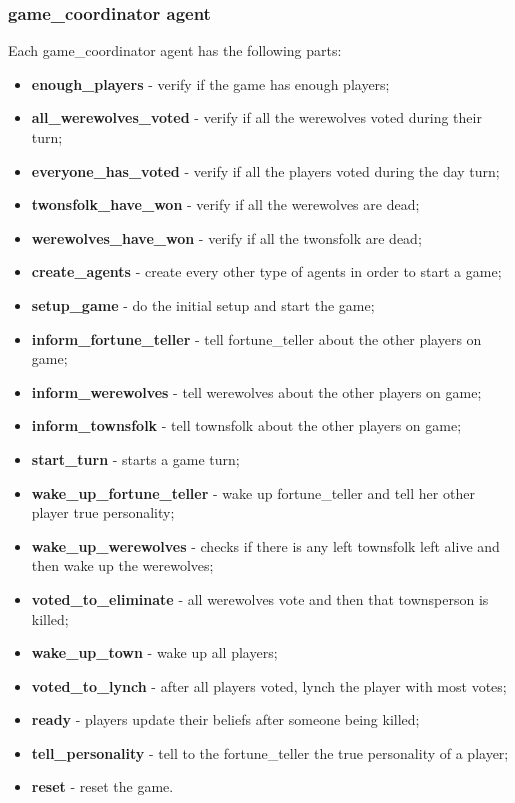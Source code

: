 \documentclass{article}
\begin{document}
\subsubsection{game\_coordinator agent}
Each game\_coordinator agent has the following parts:
\begin{itemize}
	\item \textbf{enough\_players} - verify if the game has enough players;
	\item \textbf{all\_werewolves\_voted} - verify if all the werewolves voted during their turn;
	\item \textbf{everyone\_has\_voted} - verify if all the players voted during the day turn;
	\item \textbf{twonsfolk\_have\_won} - verify if all the werewolves are dead;
	\item \textbf{werewolves\_have\_won} - verify if all the twonsfolk are dead;
	\item \textbf{create\_agents} - create every other type of agents in order to start a game;
	\item \textbf{setup\_game} -  do the initial setup and start the game;
	\item \textbf{inform\_fortune\_teller} - tell fortune\_teller about the other players on game;
	\item \textbf{inform\_werewolves} - tell werewolves about the other players on game;
	\item \textbf{inform\_townsfolk} - tell townsfolk about the other players on game;
	\item \textbf{start\_turn} - starts a game turn;
	\item \textbf{wake\_up\_fortune\_teller} - wake up fortune\_teller and tell her other player true personality;
	\item \textbf{wake\_up\_werewolves} - checks if there is any left townsfolk left alive and then wake up the werewolves;
	\item \textbf{voted\_to\_eliminate} - all werewolves vote and then that townsperson is killed;
	\item \textbf{wake\_up\_town} - wake up all players;
	\item \textbf{voted\_to\_lynch} - after all players voted, lynch the player with most votes;
	\item \textbf{ready} - players update their beliefs after someone being killed;
	\item \textbf{tell\_personality} - tell to the fortune\_teller the true personality of a player;
	\item \textbf{reset} - reset the game.
\end{itemize} 
\end{document}
